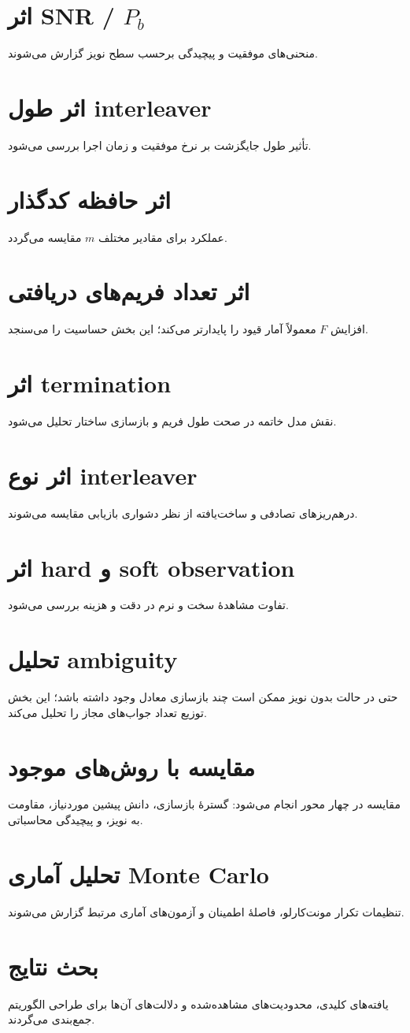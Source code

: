 \section{اثر SNR / \(P_b\)}
منحنی‌های موفقیت و پیچیدگی برحسب سطح نویز گزارش می‌شوند.

\section{اثر طول interleaver}
تأثیر طول جایگزشت بر نرخ موفقیت و زمان اجرا بررسی می‌شود.

\section{اثر حافظه کدگذار}
عملکرد برای مقادیر مختلف \(m\) مقایسه می‌گردد.

\section{اثر تعداد فریم‌های دریافتی}
افزایش \(F\) معمولاً آمار قیود را پایدارتر می‌کند؛ این بخش حساسیت را می‌سنجد.

\section{اثر termination}
نقش مدل خاتمه در صحت طول فریم و بازسازی ساختار تحلیل می‌شود.

\section{اثر نوع interleaver}
درهم‌ریزهای تصادفی و ساخت‌یافته از نظر دشواری بازیابی مقایسه می‌شوند.

\section{اثر hard و soft observation}
تفاوت مشاهدهٔ سخت و نرم در دقت و هزینه بررسی می‌شود.

\section{تحلیل ambiguity}
حتی در حالت بدون نویز ممکن است چند بازسازی معادل وجود داشته باشد؛ این بخش توزیع تعداد جواب‌های مجاز را تحلیل می‌کند.

\section{مقایسه با روش‌های موجود}
مقایسه در چهار محور انجام می‌شود: گسترهٔ بازسازی، دانش پیشین موردنیاز، مقاومت به نویز، و پیچیدگی محاسباتی.

\section{تحلیل آماری Monte Carlo}
تنظیمات تکرار مونت‌کارلو، فاصلهٔ اطمینان و آزمون‌های آماری مرتبط گزارش می‌شوند.

\section{بحث نتایج}
یافته‌های کلیدی، محدودیت‌های مشاهده‌شده و دلالت‌های آن‌ها برای طراحی الگوریتم جمع‌بندی می‌گردند.
